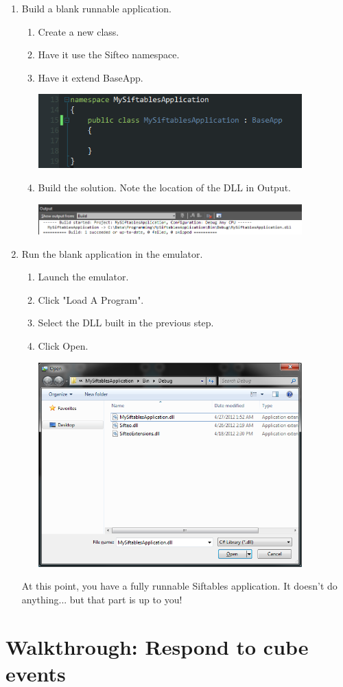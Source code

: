 \documentclass[12pt]{article}
\begin{document}
\begin{enumerate}
\item Build a blank runnable application.
\begin{enumerate}
\item Create a new class.
\item Have it use the Sifteo namespace.
\item Have it extend BaseApp.
\begin{center}\includegraphics[width=4in]{2-1BlankApp}\end{center}
\item Build the solution. Note the location of the DLL in Output.
\begin{center}\includegraphics[width=4in]{2-2Output}\end{center}
\end{enumerate}

\item Run the blank application in the emulator.
\begin{enumerate}
\item Launch the emulator.
\item Click "Load A Program".
\item Select the DLL built in the previous step.
\item Click Open.
\begin{center}\includegraphics[width=4in]{3-1Open}\end{center}
\end{enumerate}
At this point, you have a fully runnable Siftables application. It doesn't do anything... but that part is up to you!\\

\end{enumerate}

\section{Walkthrough: Respond to cube events}
\end{document}

